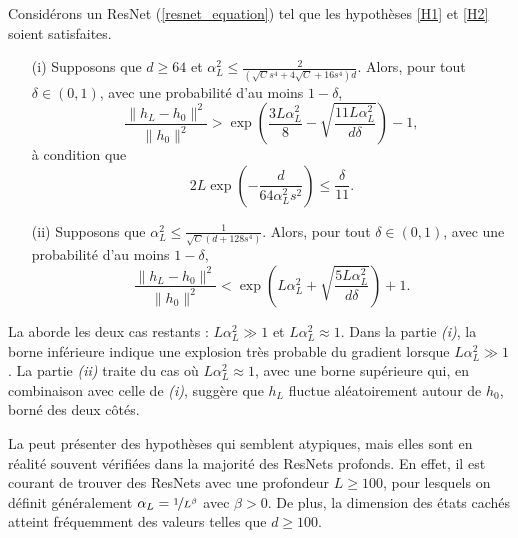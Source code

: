 \begin{proposition}[Admise]\label{prop3}
    Considérons un ResNet (\ref{resnet_equation}) tel que les hypothèses \ref{H1} et \ref{H2} soient satisfaites.
    \begin{itemize}
        \item[(i)] Supposons que $ d \geqslant 64 $ et $ \alpha _L ^2 \leqslant  \frac{2}{ (\sqrt{C} s^4 + 4 \sqrt{C} + 16 s ^4) d } $. Alors, pour tout $ \delta \in (0, 1) $, avec une probabilité d'au moins $ 1 - \delta $,
        \[
            \frac{\|h_L - h_0\|^2}{\|h_0\|^2} > \exp\left(\frac{3L\alpha_L^2}{8} - \sqrt{\frac{11L\alpha_L^2}{d\delta}}\right) - 1,
        \]
        à condition que
        \[
            2L \exp\left(-\frac{d}{64\alpha_L^2s^2}\right) \leqslant \frac{\delta}{11}.
        \]
        \item[(ii)] Supposons que $ \alpha_L^2 \leqslant \frac{1}{\sqrt{C}(d + 128s^4)} $. Alors, pour tout $ \delta \in (0, 1)$, avec une probabilité d'au moins $1 - \delta $,
        \[
            \frac{\|h_L - h_0\|^2}{\|h_0\|^2} < \exp\left(L\alpha_L^2 + \sqrt{\frac{5L\alpha_L^2}{d\delta}}\right) + 1.
        \]
    \end{itemize}
\end{proposition}
La  aborde les deux cas restants : $L \alpha_L^2 \gg 1$ et $L \alpha_L^2 \approx 1$. Dans la partie \textit{(i)}, la borne inférieure indique une explosion très probable du gradient lorsque $L \alpha_L^2 \gg 1$. La partie \textit{(ii)} traite du cas où $L \alpha_L^2 \approx 1$, avec une borne supérieure qui, en combinaison avec celle de \textit{(i)}, suggère que $h_L$ fluctue aléatoirement autour de $h_0$, borné des deux côtés.

La  peut présenter des hypothèses qui semblent atypiques, mais elles sont en réalité souvent vérifiées dans la majorité des ResNets profonds. En effet, il est courant de trouver des ResNets avec une profondeur $L \geqslant 100$, pour lesquels on définit généralement $\alpha_L = \nicefrac{1}{L^\beta}$ avec $\beta > 0$. De plus, la dimension des états cachés atteint fréquemment des valeurs telles que $d \geqslant 100$.

